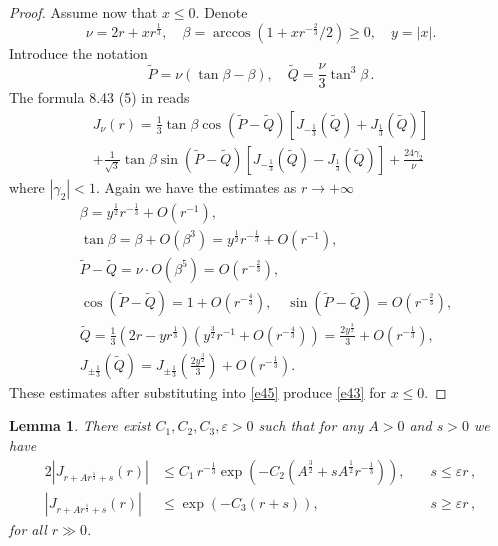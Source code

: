 \documentclass[12pt]{amsart}
\newcommand{\wt}{\widetilde}
\newcommand{\ep}{\varepsilon}
\newcommand{\g}{\gamma}
\theoremstyle{plain}
\newtheorem{lemma}{Lemma}[section]
\theoremstyle{definition}
\numberwithin{equation}{section}
\begin{document}
\begin{proof}
Assume now that $x\le 0$. Denote
%
\begin{equation*}
\nu=2r+xr^{\frac 13},\quad \beta=\operatorname{arccos}\left(1+xr^{-\frac 
23}/2\right)\ge 0,\quad y=|x|.
\end{equation*}
%
Introduce the notation
%
\begin{equation*}
\wt P=\nu(\tan\beta-\beta),\quad
\wt Q=\frac \nu 3\tan^3\beta\,.
\end{equation*}
%
The formula 8.43 (5) in \cite{W} reads
%
\begin{multline}\label{e45}
J_{\nu}(r)=\frac 13 \tan \beta\cos\left(\wt P-\wt Q\right)\left[J_{-\frac 
13}\left(\wt Q\right)+J_{\frac 13}\left(\wt Q\right)\right]\\
+\frac 1{\sqrt{3}} \tan \beta\sin\left(\wt P-\wt Q\right)\left[J_{-\frac 
13}\left(\wt Q\right)-J_{\frac 13}\left(\wt 
Q\right)\right]+\frac{24\g_2}{\nu}
\end{multline}
%
where $|\g_2|<1$. Again we have the estimates  as $r\to+\infty$
%
\begin{align*}
&\beta=y^{\frac 12}r^{-\frac 13}+O(r^{-1}),\\
&\tan\beta=\beta+O(\beta^3)=y^{\frac 12}r^{-\frac 13}+O(r^{-1}),\\
&\wt P-\wt Q=\nu\cdot O(\beta^5)=O(r^{-\frac 23}),\\
&\cos\left(\wt P-\wt Q\right)=1+O(r^{-\frac 43}),\quad
\sin\left(\wt P-\wt Q\right)=O(r^{-\frac 23}),\\
&\wt Q=\frac 13\left(2r-yr^{\frac 13}\right)\left(y^{\frac 32}r^{- 1}+O(r^{-\frac 
43})\right)=\frac{2y^{\frac 32}}3+O(r^{-\frac 13}),\\
&J_{\pm\frac 13}\left(\wt Q\right)=J_{\pm\frac 13}\left(\frac {2y^{\frac 
32}}{3}\right)+O(r^{-\frac 13}).
\end{align*}
%
These estimates after substituting into \eqref{e45} produce \eqref{e43}  for $x\le 0$. 
\end{proof}


\begin{lemma}\label{l46} There exist $C_1,C_2,C_3,\ep>0$ such that for any $A>0$ and $s>0$ we have
%
\begin{alignat}{2}
\left|J_{r+Ar^{\frac 13}+s}(r)\right|&\le
C_1\,{r^{-\frac13}}{\exp\left(-C_2\left(A^{\frac 32}+sA^{\frac
12}r^{-\frac 13}\right)\right)},\quad &s\le \varepsilon r \,, \label{e46a} \\
\left|J_{r+Ar^{\frac 13}+s}(r)\right|&\le
\exp\left(-C_3(r+s)\right), \quad &s\ge \varepsilon r\,, \label{e46b}
\end{alignat}
% 
for all $r\gg 0$.
\end{lemma} 
\end{document}
